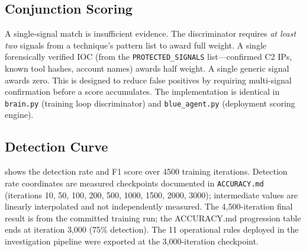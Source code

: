 \documentclass[sigconf, nonacm]{acmart}
\begin{document}
\subsection{Conjunction Scoring}

A single-signal match is insufficient evidence. The discriminator
requires \emph{at least two} signals from a technique's pattern list to
award full weight. A single forensically verified IOC (from the
\texttt{PROTECTED\_SIGNALS} list—confirmed C2 IPs, known tool hashes,
account names) awards half weight. A single generic signal awards zero.
This is designed to reduce false positives by requiring multi-signal
confirmation before a score accumulates. The implementation is
identical in \texttt{brain.py} (training loop discriminator) and
\texttt{blue\_agent.py} (deployment scoring engine).

\subsection{Detection Curve}

 shows the detection rate and F1 score over \num{4500}
training iterations. Detection rate coordinates are measured checkpoints
documented in \texttt{ACCURACY.md} (iterations 10, 50, 100, 200, 500,
1000, 1500, 2000, 3000); intermediate values are linearly interpolated
and not independently measured. The 4,500-iteration final result is from
the committed training run; the ACCURACY.md progression table ends at
iteration 3,000 (75\% detection). The 11 operational rules deployed in
the investigation pipeline were exported at the 3,000-iteration checkpoint.
\end{document}
